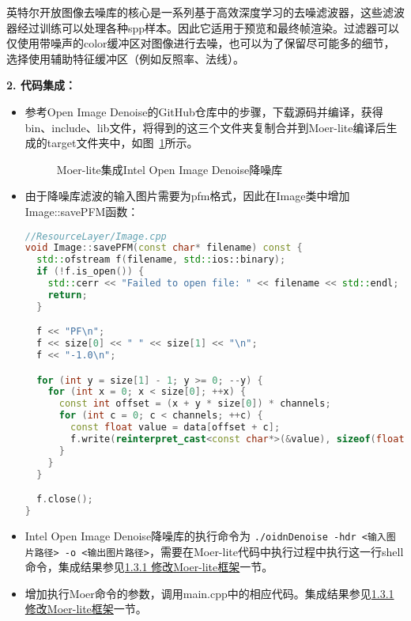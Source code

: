 \documentclass[lang=cn,10pt]{elegantbook}
\begin{document}
英特尔开放图像去噪库\cite{oidn_website}的核心是一系列基于高效深度学习的去噪滤波器，这些滤波器经过训练可以处理各种spp样本。因此它适用于预览和最终帧渲染。过滤器可以仅使用带噪声的color缓冲区对图像进行去噪，也可以为了保留尽可能多的细节，选择使用辅助特征缓冲区（例如反照率、法线）。

\textcolor{third}{\textbf{2. 代码集成：}}
\begin{itemize}
\item 参考Open Image Denoise的GitHub仓库\cite{oidn_github}中的步骤，下载源码并编译，获得bin、include、lib文件，将得到的这三个文件夹复制合并到Moer-lite编译后生成的target文件夹中，如图~\ref{fig:oidfigures}所示。

\begin{figure}[htp] %
\centering
  \hfill

  \caption{Moer-lite集成Intel Open Image Denoise降噪库}
  \label{fig:oidfigures}

\end{figure}

\item 由于降噪库滤波的输入图片需要为pfm格式，因此在Image类中增加Image::savePFM函数：
\begin{lstlisting}[language=c++]
//ResourceLayer/Image.cpp
void Image::savePFM(const char* filename) const {
  std::ofstream f(filename, std::ios::binary);
  if (!f.is_open()) {
    std::cerr << "Failed to open file: " << filename << std::endl;
    return;
  }

  f << "PF\n";
  f << size[0] << " " << size[1] << "\n";
  f << "-1.0\n";

  for (int y = size[1] - 1; y >= 0; --y) {
    for (int x = 0; x < size[0]; ++x) {
      const int offset = (x + y * size[0]) * channels;
      for (int c = 0; c < channels; ++c) {
        const float value = data[offset + c];
        f.write(reinterpret_cast<const char*>(&value), sizeof(float));
      }
    }
  }

  f.close();
}
\end{lstlisting}

\item Intel Open Image Denoise降噪库的执行命令为
\texttt{./oidnDenoise -hdr <输入图片路径> -o <输出图片路径>}，需要在Moer-lite代码中执行过程中执行这一行shell命令，集成结果参见\hyperref[sec:modify-moer-lite]{1.3.1 修改Moer-lite框架}一节。

\item 增加执行Moer命令的参数，调用main.cpp中的相应代码。集成结果参见\hyperref[sec:modify-moer-lite]{1.3.1 修改Moer-lite框架}一节。

\end{itemize}
\end{document}
